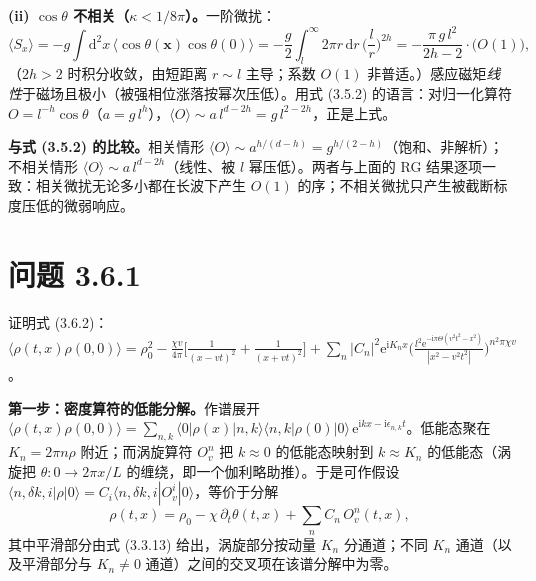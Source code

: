 \textbf{(ii) $\cos\theta$ 不相关（$\kappa<1/8\pi$）。}一阶微扰：
\begin{equation*}
\langle S_x\rangle=-g\int\mathrm{d}^{2}x\,\langle\cos\theta(\pmb{x})\cos\theta(0)\rangle
=-\frac{g}{2}\int_{l}^{\infty}2\pi r\,\mathrm{d}r\,\Big(\frac{l}{r}\Big)^{2h}
=-\frac{\pi\,g\,l^{2}}{2h-2}\cdot\big(O(1)\big),
\end{equation*}
（$2h>2$ 时积分收敛，由短距离 $r\sim l$ 主导；系数 $O(1)$ 非普适。）感应磁矩\emph{线性}于磁场且极小（被强相位涨落按幂次压低）。用式 (3.5.2) 的语言：对归一化算符 $O=l^{-h}\cos\theta$（$a=g\,l^{h}$），$\langle O\rangle\sim a\,l^{d-2h}=g\,l^{2-2h}$，正是上式。

\textbf{与式 (3.5.2) 的比较。}相关情形 $\langle O\rangle\sim a^{h/(d-h)}=g^{h/(2-h)}$（饱和、非解析）；不相关情形 $\langle O\rangle\sim a\,l^{d-2h}$（线性、被 $l$ 幂压低）。两者与上面的 RG 结果逐项一致：相关微扰无论多小都在长波下产生 $O(1)$ 的序；不相关微扰只产生被截断标度压低的微弱响应。

\section*{问题 3.6.1}
\begin{problem}
证明式 (3.6.2)：
$\langle\rho(t,x)\rho(0,0)\rangle=\rho_0^{2}-\frac{\chi v}{4\pi}\big[\frac{1}{(x-vt)^{2}}+\frac{1}{(x+vt)^{2}}\big]+\sum_n|C_n|^{2}\mathrm{e}^{\mathrm{i}K_nx}\big(\frac{l^{2}\mathrm{e}^{-\mathrm{i}\pi\Theta(v^{2}t^{2}-x^{2})}}{|x^{2}-v^{2}t^{2}|}\big)^{n^{2}\pi\chi v}$。
\end{problem}
\solution

\textbf{第一步：密度算符的低能分解。}作谱展开 $\langle\rho(t,x)\rho(0,0)\rangle=\sum_{n,k}\langle0|\rho(x)|n,k\rangle\langle n,k|\rho(0)|0\rangle\,\mathrm{e}^{\mathrm{i}kx-\mathrm{i}\epsilon_{n,k}t}$。低能态聚在 $K_n=2\pi n\rho$ 附近；而涡旋算符 $O_v^{n}$ 把 $k\approx0$ 的低能态映射到 $k\approx K_n$ 的低能态（涡旋把 $\theta:0\to2\pi x/L$ 的缠绕，即一个伽利略助推）。于是可作假设 $\langle n,\delta k,i|\rho|0\rangle=C_i\langle n,\delta k,i|O_v^{i}|0\rangle$，等价于分解
\begin{equation*}
\rho(t,x)=\rho_0-\chi\,\partial_t\theta(t,x)+\sum_n C_n\,O_v^{n}(t,x) ,
\end{equation*}
其中平滑部分由式 (3.3.13) 给出，涡旋部分按动量 $K_n$ 分通道；不同 $K_n$ 通道（以及平滑部分与 $K_n\neq0$ 通道）之间的交叉项在该谱分解中为零。

